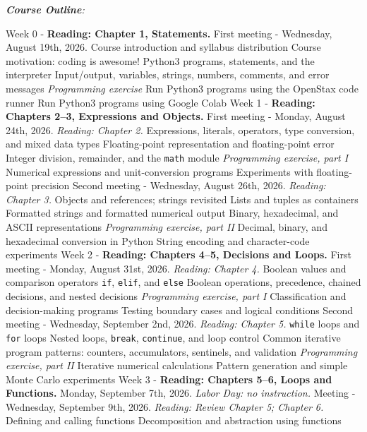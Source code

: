 \documentclass[10pt]{article}
\begin{document}
\textit{\textbf{Course Outline}:}
\begin{outline}[enumerate]
\1 Week 0 - \textbf{Reading: Chapter 1, Statements.}
\2 First meeting - Wednesday, August 19th, 2026.
\3 Course introduction and syllabus distribution
\3 Course motivation: coding is awesome!
\3 Python3 programs, statements, and the interpreter
\3 Input/output, variables, strings, numbers, comments, and error messages
\3 \textit{Programming exercise}
\4 Run Python3 programs using the OpenStax code runner
\4 Run Python3 programs using Google Colab
\1 Week 1 - \textbf{Reading: Chapters 2--3, Expressions and Objects.}
\2 First meeting - Monday, August 24th, 2026. \textit{Reading: Chapter 2.}
\3 Expressions, literals, operators, type conversion, and mixed data types
\3 Floating-point representation and floating-point error
\3 Integer division, remainder, and the \texttt{math} module
\3 \textit{Programming exercise, part I}
\4 Numerical expressions and unit-conversion programs
\4 Experiments with floating-point precision
\2 Second meeting - Wednesday, August 26th, 2026. \textit{Reading: Chapter 3.}
\3 Objects and references; strings revisited
\3 Lists and tuples as containers
\3 Formatted strings and formatted numerical output
\3 Binary, hexadecimal, and ASCII representations
\3 \textit{Programming exercise, part II}
\4 Decimal, binary, and hexadecimal conversion in Python
\4 String encoding and character-code experiments
\1 Week 2 - \textbf{Reading: Chapters 4--5, Decisions and Loops.}
\2 First meeting - Monday, August 31st, 2026. \textit{Reading: Chapter 4.}
\3 Boolean values and comparison operators
\3 \texttt{if}, \texttt{elif}, and \texttt{else}
\3 Boolean operations, precedence, chained decisions, and nested decisions
\3 \textit{Programming exercise, part I}
\4 Classification and decision-making programs
\4 Testing boundary cases and logical conditions
\2 Second meeting - Wednesday, September 2nd, 2026. \textit{Reading: Chapter 5.}
\3 \texttt{while} loops and \texttt{for} loops
\3 Nested loops, \texttt{break}, \texttt{continue}, and loop control
\3 Common iterative program patterns: counters, accumulators, sentinels, and validation
\3 \textit{Programming exercise, part II}
\4 Iterative numerical calculations
\4 Pattern generation and simple Monte Carlo experiments
\1 Week 3 - \textbf{Reading: Chapters 5--6, Loops and Functions.}
\2 Monday, September 7th, 2026. \textit{Labor Day: no instruction.}
\2 Meeting - Wednesday, September 9th, 2026. \textit{Reading: Review Chapter 5; Chapter 6.}
\3 Defining and calling functions
\3 Decomposition and abstraction using functions

\end{outline}
\end{document}
